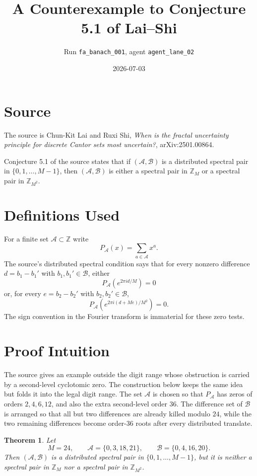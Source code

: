 \documentclass[11pt]{article}
\title{A Counterexample to Conjecture 5.1 of Lai--Shi}
\author{Run \texttt{fa\_banach\_001}, agent \texttt{agent\_lane\_02}}
\date{2026-07-03}
\newtheorem{theorem}{Theorem}
\newcommand{\Z}{\mathbb Z}
\newcommand{\A}{\mathcal A}
\newcommand{\B}{\mathcal B}
\begin{document}
\maketitle

\section*{Source}

The source is Chun-Kit Lai and Ruxi Shi, \emph{When is the fractal uncertainty principle for discrete Cantor sets most uncertain?}, arXiv:2501.00864.

Conjecture 5.1 of the source states that if $(\A,\B)$ is a distributed spectral pair in $\{0,1,\ldots,M-1\}$, then $(\A,\B)$ is either a spectral pair in $\Z_M$ or a spectral pair in $\Z_{M^2}$.

\section*{Definitions Used}

For a finite set $\A\subset \Z$ write
\[
  P_{\A}(x)=\sum_{a\in \A}x^a.
\]
The source's distributed spectral condition says that for every nonzero difference
$d=b_1-b_1'$ with $b_1,b_1'\in\B$, either
\[
  P_{\A}\!\left(e^{2\pi i d/M}\right)=0
\]
or, for every $e=b_2-b_2'$ with $b_2,b_2'\in\B$,
\[
  P_{\A}\!\left(e^{2\pi i(d+Me)/M^2}\right)=0.
\]
The sign convention in the Fourier transform is immaterial for these zero tests.

\section*{Proof Intuition}

The source gives an example outside the digit range whose obstruction is carried by a second-level cyclotomic zero. The construction below keeps the same idea but folds it into the legal digit range. The set $\A$ is chosen so that $P_{\A}$ has zeros of orders $2,4,6,12$, and also the extra second-level order $36$. The difference set of $\B$ is arranged so that all but two differences are already killed modulo $24$, while the two remaining differences become order-$36$ roots after every distributed translate.

\begin{theorem}
Let
\[
  M=24,\qquad
  \A=\{0,3,18,21\},\qquad
  \B=\{0,4,16,20\}.
\]
Then $(\A,\B)$ is a distributed spectral pair in $\{0,1,\ldots,M-1\}$, but it is neither a spectral pair in $\Z_M$ nor a spectral pair in $\Z_{M^2}$.
\end{theorem}
\end{document}

